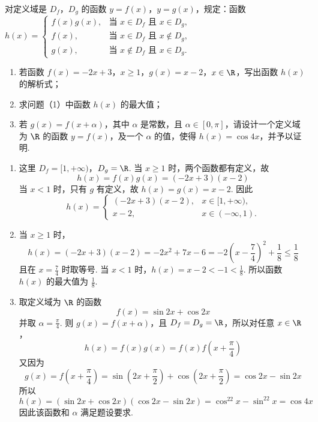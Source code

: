 \begin{problem}
对定义域是 \(D_f\)，\(D_g\) 的函数 \(y = f(x)\)，\(y = g(x)\)，规定：函数
\(h(x) = \begin{cases}
f(x)g(x), & \text{当 } x \in D_f \text{ 且 } x \in D_g,\\
f(x), & \text{当 } x \in D_f \text{ 且 } x \notin D_g,\\
g(x), & \text{当 } x \notin D_f \text{ 且 } x \in D_g.
\end{cases}\)

\begin{enumerate}
\item 若函数 \( f(x) = -2x + 3\)，\(x \geqslant 1\)，\(g(x) = x - 2\)，\(x \in \R\)，写出函数 \(h(x)\) 的解析式；
\item 求问题（1）中函数 \(h(x)\) 的最大值；
\item 若 \(g(x) = f(x + \alpha)\)，其中 \(\alpha\) 是常数，且 \(\alpha \in [0,\pi]\)，请设计一个定义域为 \(\R\) 的函数 \(y = f(x)\)，及一个 \(\alpha\) 的值，使得 \(h(x) = \cos 4x\)，并予以证明.
\end{enumerate}
\end{problem}

\begin{solution}
\begin{enumerate}
\item 这里 \(D_f=[1,+\infty)\)，\(D_g=\R\). 当 \(x\geqslant1\) 时，两个函数都有定义，故
\[
h(x)=f(x)g(x)=(-2x+3)(x-2)
\]
当 \(x<1\) 时，只有 \(g\) 有定义，故 \(h(x)=g(x)=x-2\). 因此
\[
h(x)=\begin{cases}
(-2x+3)(x-2),&x\in[1,+\infty),\\
x-2,&x\in(-\infty,1).
\end{cases}
\]

\item 当 \(x\geqslant1\) 时，
\[
h(x)=(-2x+3)(x-2)=-2x^2+7x-6=-2\left(x-\frac74\right)^2+\frac18\leqslant\frac18
\]
且在 \(x=\frac74\) 时取等号. 当 \(x<1\) 时，\(h(x)=x-2<-1<\frac18\). 所以函数 \(h(x)\) 的最大值为 \(\frac18\).

\item 取定义域为 \(\R\) 的函数
\[
f(x)=\sin2x+\cos2x
\]
并取 \(\alpha=\frac\pi4\). 则 \(g(x)=f(x+\alpha)\)，且 \(D_f=D_g=\R\)，所以对任意 \(x\in\R\)，
\[
h(x)=f(x)g(x)=f(x)f\left(x+\frac\pi4\right)
\]
又因为
\[
g(x)=f\left(x+\frac\pi4\right)=\sin\left(2x+\frac\pi2\right)+\cos\left(2x+\frac\pi2\right)=\cos2x-\sin2x
\]
所以
\[
h(x)=(\sin2x+\cos2x)(\cos2x-\sin2x)=\cos^22x-\sin^22x=\cos4x
\]
因此该函数和 \(\alpha\) 满足题设要求.
\end{enumerate}
\end{solution}
